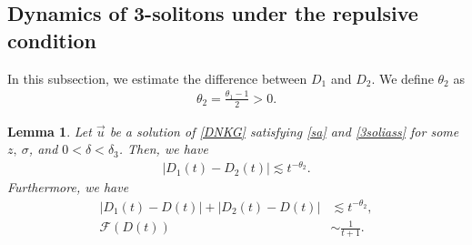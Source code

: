 \documentclass[reqno]{amsart}
\theoremstyle{plain}
\newtheorem{lemma}[theorem]{Lemma}
\theoremstyle{definition}
\numberwithin{equation}{section}
\newcommand{\1}{\mathbbm{1}}
\begin{document}
\subsection{Dynamics of 3-solitons under the repulsive condition}
In this subsection, we estimate the difference between $D_1$ and $D_2$. We define $\theta_2$ as
\begin{align}\label{theta2}
\theta_2=\frac{\theta_1-1}{2}>0.
\end{align}
\begin{lemma}\label{Dnosalem}
Let $\vec{u}$ be a solution of \eqref{DNKG} satisfying \eqref{sa} and \eqref{3soliass} for some $z,\ \sigma$, and $0<\delta<\delta_3$. Then, we have
\begin{align}\label{Dnosaes}
\left|D_1(t)-D_2(t)\right|\lesssim t^{-\theta_2}.
\end{align}
Furthermore, we have 
\begin{align}
|D_1(t)-D(t)|+|D_2(t)-D(t)|&\lesssim t^{-\theta_2},\label{Dnosaes2}
\\
\mathcal{F}(D(t))&\sim \frac{1}{t+1}.\label{logtorder}
\end{align}
\end{lemma}
\end{document}
